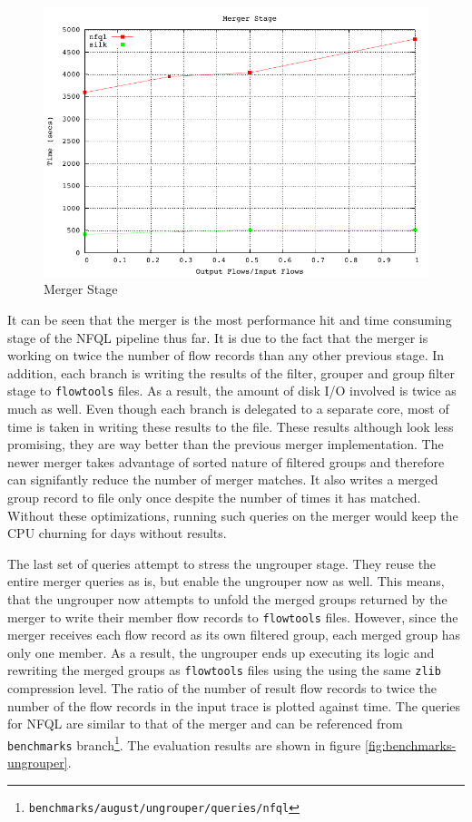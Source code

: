 \begin{figure}[ht!]
  \begin{center}
    \includegraphics* [width=0.8\linewidth]{figures/benchmarks/merger}
    \caption{Merger Stage}
    \label{fig:benchmarks-merger}
  \end{center}
\end{figure}

It can be seen that the merger is the most performance hit and time consuming
stage of the \ac{NFQL} pipeline thus far. It is due to the fact that the
merger is working on twice the number of flow records than any other previous
stage. In addition, each branch is writing the results of the filter, grouper
and group filter stage to \texttt{flowtools} files. As a result, the amount of
disk I/O involved is twice as much as well. Even  though each branch is delegated to a separate core, most
of time is taken in writing these results to the file. These results
although look less promising, they are way better than the previous merger
implementation. The newer merger takes advantage of sorted nature of
filtered groups and therefore can signifantly reduce the number of merger
matches. It also writes a merged group record to file only once despite the
number of times it has matched. Without these optimizations, running such
queries on the merger would keep the CPU churning for days without results.


The last set of queries attempt to stress the ungrouper stage. They reuse the
entire merger queries as is, but enable the ungrouper now as well. This means,
that the ungrouper now attempts to unfold the merged groups returned by the
merger to write their member flow records to \texttt{flowtools} files.
However, since the merger receives each flow record as its
 own filtered group, each merged group has
only one member. As a result, the ungrouper ends up executing its logic and
rewriting the merged groups as \texttt{flowtools} files using the using the
same \texttt{zlib} compression level. The ratio of the number of result flow
records to twice the number of the flow records in the input trace is plotted
against time. The queries for \ac{NFQL} are similar to that of the merger and
can be referenced from \texttt{benchmarks}
branch\footnote{\texttt{benchmarks/august/ungrouper/queries/nfql}}.  The
evaluation results are shown in figure \ref{fig:benchmarks-ungrouper}.

